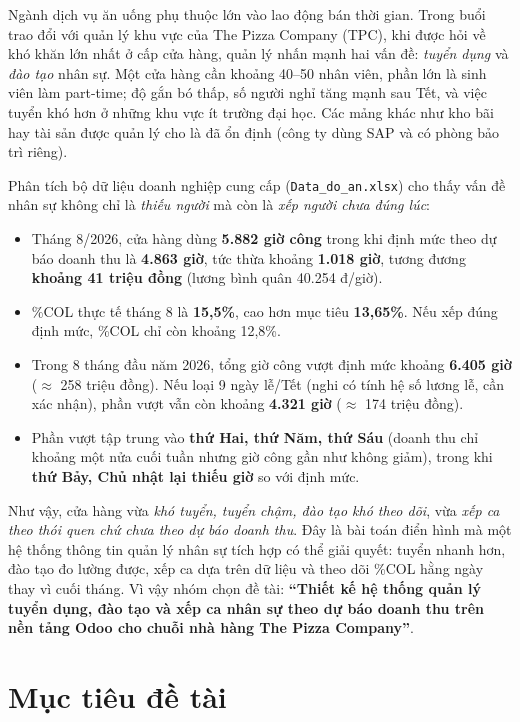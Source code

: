 \documentclass[12pt,a4paper,oneside]{report}
\begin{document}
Ngành dịch vụ ăn uống phụ thuộc lớn vào lao động bán thời gian. Trong buổi trao đổi với quản lý khu vực của The Pizza Company (TPC), khi được hỏi về khó khăn lớn nhất ở cấp cửa hàng, quản lý nhấn mạnh hai vấn đề: \emph{tuyển dụng} và \emph{đào tạo} nhân sự. Một cửa hàng cần khoảng 40–50 nhân viên, phần lớn là sinh viên làm part-time; độ gắn bó thấp, số người nghỉ tăng mạnh sau Tết, và việc tuyển khó hơn ở những khu vực ít trường đại học. Các mảng khác như kho bãi hay tài sản được quản lý cho là đã ổn định (công ty dùng SAP và có phòng bảo trì riêng).

Phân tích bộ dữ liệu doanh nghiệp cung cấp (\texttt{Data\_do\_an.xlsx}) cho thấy vấn đề nhân sự không chỉ là \emph{thiếu người} mà còn là \emph{xếp người chưa đúng lúc}:

\begin{itemize}
\item Tháng 8/2026, cửa hàng dùng \textbf{5.882 giờ công} trong khi định mức theo dự báo doanh thu là \textbf{4.863 giờ}, tức thừa khoảng \textbf{1.018 giờ}, tương đương \textbf{khoảng 41 triệu đồng} (lương bình quân 40.254 đ/giờ).
\item \%COL thực tế tháng 8 là \textbf{15,5\%}, cao hơn mục tiêu \textbf{13,65\%}. Nếu xếp đúng định mức, \%COL chỉ còn khoảng 12,8\%.
\item Trong 8 tháng đầu năm 2026, tổng giờ công vượt định mức khoảng \textbf{6.405 giờ} ($\approx$ 258 triệu đồng). Nếu loại 9 ngày lễ/Tết (nghi có tính hệ số lương lễ, cần xác nhận), phần vượt vẫn còn khoảng \textbf{4.321 giờ} ($\approx$ 174 triệu đồng).
\item Phần vượt tập trung vào \textbf{thứ Hai, thứ Năm, thứ Sáu} (doanh thu chỉ khoảng một nửa cuối tuần nhưng giờ công gần như không giảm), trong khi \textbf{thứ Bảy, Chủ nhật lại thiếu giờ} so với định mức.
\end{itemize}

Như vậy, cửa hàng vừa \emph{khó tuyển, tuyển chậm, đào tạo khó theo dõi}, vừa \emph{xếp ca theo thói quen chứ chưa theo dự báo doanh thu}. Đây là bài toán điển hình mà một hệ thống thông tin quản lý nhân sự tích hợp có thể giải quyết: tuyển nhanh hơn, đào tạo đo lường được, xếp ca dựa trên dữ liệu và theo dõi \%COL hằng ngày thay vì cuối tháng. Vì vậy nhóm chọn đề tài: \textbf{``Thiết kế hệ thống quản lý tuyển dụng, đào tạo và xếp ca nhân sự theo dự báo doanh thu trên nền tảng Odoo cho chuỗi nhà hàng The Pizza Company''}.

\section{Mục tiêu đề tài}
\end{document}
